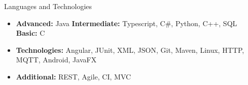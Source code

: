 \documentclass[]{style}
\begin{document}
	\begin{cvsection}{Languages and Technologies}
		\begin{cvsubsection}{}{}{}	
			\begin{itemize}
				\item \textbf{Advanced:} Java \textbf{Intermediate:} Typescript, C\#, Python, C++, SQL \textbf{Basic:} C 
				\item \textbf{Technologies:} Angular, JUnit, XML, JSON, Git, Maven, Linux, HTTP, MQTT, Android, JavaFX
				\item \textbf{Additional:} REST, Agile, CI, MVC
			\end{itemize}
		\end{cvsubsection}
	\end{cvsection}
	
\end{document}
